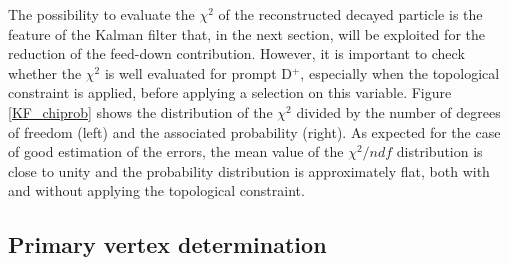 \documentclass[b5paper,10pt,twoside,oldstyle,classica]{toptesi}
\begin{document}
The possibility to evaluate the $\chi^2$ of the reconstructed decayed particle is the feature of the Kalman filter that, in the next section, will be exploited for the reduction of the feed-down contribution. However, it is important to check whether the $\chi^2$ is well evaluated for prompt D$^+$, especially when the topological constraint is applied, before applying a selection on this variable. Figure \ref{KF_chiprob} shows the distribution of the $\chi^2$ divided by the number of degrees of freedom (left) and the associated probability (right). As expected for the case of good estimation of the errors, the mean value of the $\chi^2/ndf$ distribution is close to unity and the probability distribution is approximately flat, both with and without applying the topological constraint.    
\subsection{Primary vertex determination}
\end{document}
